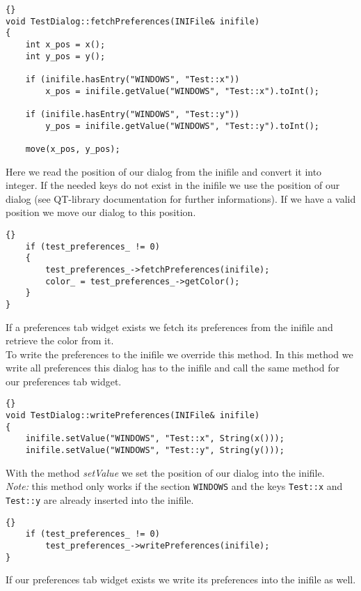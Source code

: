 \begin{lstlisting}{}
void TestDialog::fetchPreferences(INIFile& inifile)
{
	int x_pos = x();
	int y_pos = y();

	if (inifile.hasEntry("WINDOWS", "Test::x"))
		x_pos = inifile.getValue("WINDOWS", "Test::x").toInt();

	if (inifile.hasEntry("WINDOWS", "Test::y"))
		y_pos = inifile.getValue("WINDOWS", "Test::y").toInt();

	move(x_pos, y_pos);
\end{lstlisting}

Here we read the position of our dialog from the inifile and convert it into
integer. If the needed keys do not exist in the inifile we use the position
of our dialog (see QT-library documentation for further informations). If
we have a valid position we move our dialog to this position.

\begin{lstlisting}{}
	if (test_preferences_ != 0)
	{
		test_preferences_->fetchPreferences(inifile);
		color_ = test_preferences_->getColor();
	}
}
\end{lstlisting}

If a preferences tab widget exists we fetch its preferences from the inifile and
retrieve the color from it.\\

To write the preferences to the inifile we override this method. In this method we
write all preferences this dialog has to the inifile and call the same method
for our preferences tab widget.

\begin{lstlisting}{}
void TestDialog::writePreferences(INIFile& inifile)
{
	inifile.setValue("WINDOWS", "Test::x", String(x()));
	inifile.setValue("WINDOWS", "Test::y", String(y()));
\end{lstlisting}

With the method {\em setValue} we set the position of our dialog into the inifile.\\
{\em Note:} this method only works if the section {\tt WINDOWS} and the keys
{\tt Test::x} and {\tt Test::y} are already inserted into the inifile.

\begin{lstlisting}{}
	if (test_preferences_ != 0)
		test_preferences_->writePreferences(inifile);
}
\end{lstlisting}

If our preferences tab widget exists we write its preferences into the inifile as well.\\

